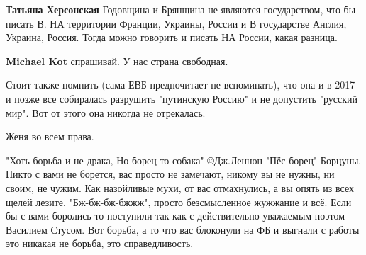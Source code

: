 \begin{itemize}
\begin{itemize}
\textbf{Татьяна Херсонская} Годовщина и Брянщина не являются государством, что бы писать В. НА территории Франции, Украины, России и В государстве Англия, Украина, Россия. Тогда можно говорить и писать НА России, какая разница.

 
\textbf{Michael Kot} спрашивай. У нас страна свободная.
\end{itemize} %

 
Стоит также помнить (сама ЕВБ предпочитает не вспоминать), что она и в 2017 и позже все собиралась разрушить "путинскую Россию" и не допустить "русский мир". Вот от этого она никогда не отрекалась.

 
Женя во всем права.

 
"Хоть борьба и не драка,
Но борец то собака"
©Дж.Леннон "Пёс-борец"
Борцуны. Никто с вами не борется, вас просто не замечают, никому вы не нужны, ни своим, не чужим. Как назойливые мухи, от вас отмахнулись, а вы опять из всех щелей лезите. "Бж-бж-бж-бжжж", просто безсмысленное жужжание и всё. Если бы с вами боролись то поступили так как с действительно уважаемым поэтом Василием Стусом. Вот борьба, а то что вас блоконули на ФБ и выгнали с работы это никакая не борьба, это справедливость.

 

\end{itemize}
